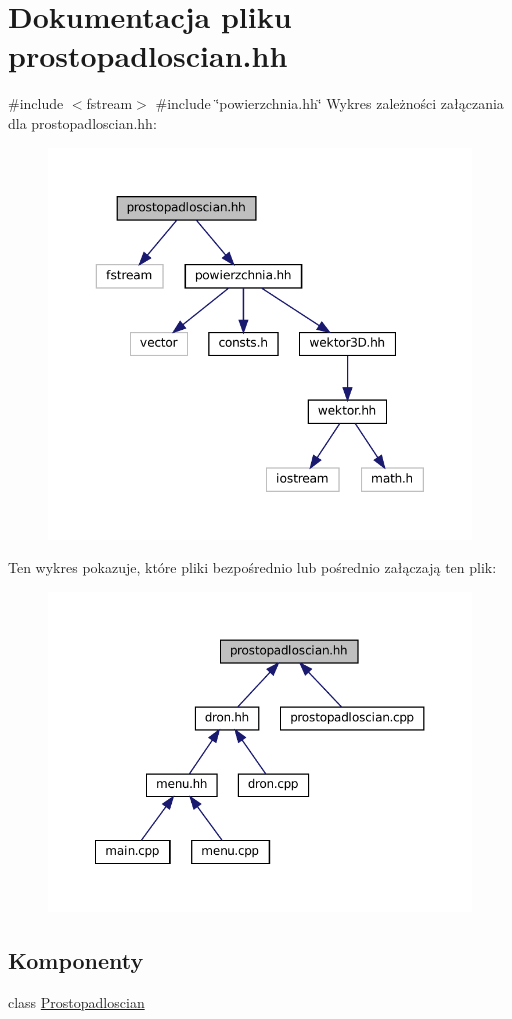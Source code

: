 \hypertarget{prostopadloscian_8hh}{}\section{Dokumentacja pliku prostopadloscian.\+hh}
\label{prostopadloscian_8hh}
{\ttfamily \#include $<$fstream$>$}\newline
{\ttfamily \#include \char`\"{}powierzchnia.\+hh\char`\"{}}\newline
Wykres zależności załączania dla prostopadloscian.\+hh\+:\nopagebreak
\begin{figure}[H]
\begin{center}
\leavevmode
\includegraphics[width=350pt]{prostopadloscian_8hh__incl}
\end{center}
\end{figure}
Ten wykres pokazuje, które pliki bezpośrednio lub pośrednio załączają ten plik\+:\nopagebreak
\begin{figure}[H]
\begin{center}
\leavevmode
\includegraphics[width=350pt]{prostopadloscian_8hh__dep__incl}
\end{center}
\end{figure}
\subsection*{Komponenty}
\begin{DoxyCompactItemize}
\item 
class \mbox{\hyperlink{class_prostopadloscian}{Prostopadloscian}}
\end{DoxyCompactItemize}
